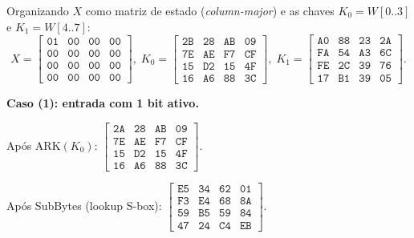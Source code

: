 \documentclass[12pt,a4paper]{article}
\newenvironment{resposta}{%
    \begin{respostabox}
    \color{red!70!black}\sloppy
}{%
    \end{respostabox}
}
\begin{document}
\begin{resposta}

Organizando $X$ como matriz de estado (\emph{column-major}) e as chaves $K_0 = W[0..3]$ e $K_1 = W[4..7]$:
\[
X = \begin{bmatrix}\texttt{01}&\texttt{00}&\texttt{00}&\texttt{00}\\\texttt{00}&\texttt{00}&\texttt{00}&\texttt{00}\\\texttt{00}&\texttt{00}&\texttt{00}&\texttt{00}\\\texttt{00}&\texttt{00}&\texttt{00}&\texttt{00}\end{bmatrix},\;
K_0 = \begin{bmatrix}\texttt{2B}&\texttt{28}&\texttt{AB}&\texttt{09}\\\texttt{7E}&\texttt{AE}&\texttt{F7}&\texttt{CF}\\\texttt{15}&\texttt{D2}&\texttt{15}&\texttt{4F}\\\texttt{16}&\texttt{A6}&\texttt{88}&\texttt{3C}\end{bmatrix},\;
K_1 = \begin{bmatrix}\texttt{A0}&\texttt{88}&\texttt{23}&\texttt{2A}\\\texttt{FA}&\texttt{54}&\texttt{A3}&\texttt{6C}\\\texttt{FE}&\texttt{2C}&\texttt{39}&\texttt{76}\\\texttt{17}&\texttt{B1}&\texttt{39}&\texttt{05}\end{bmatrix}.
\]

\textbf{Caso (1): entrada com 1 bit ativo.}

Após $\mathrm{ARK}(K_0)$:
$\left[\begin{smallmatrix}\texttt{2A}&\texttt{28}&\texttt{AB}&\texttt{09}\\\texttt{7E}&\texttt{AE}&\texttt{F7}&\texttt{CF}\\\texttt{15}&\texttt{D2}&\texttt{15}&\texttt{4F}\\\texttt{16}&\texttt{A6}&\texttt{88}&\texttt{3C}\end{smallmatrix}\right]$.

Após SubBytes (lookup S-box):
$\left[\begin{smallmatrix}\texttt{E5}&\texttt{34}&\texttt{62}&\texttt{01}\\\texttt{F3}&\texttt{E4}&\texttt{68}&\texttt{8A}\\\texttt{59}&\texttt{B5}&\texttt{59}&\texttt{84}\\\texttt{47}&\texttt{24}&\texttt{C4}&\texttt{EB}\end{smallmatrix}\right]$.


\end{resposta}
\end{document}

